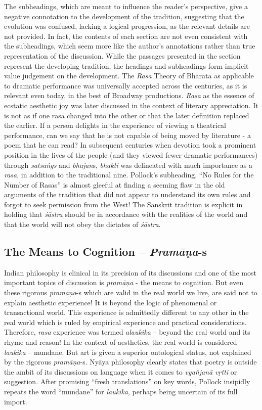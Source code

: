 The subheadings, which are meant to influence the reader’s perspective, give a negative connotation to the development of the tradition, suggesting that the evolution was confused, lacking a logical progression, as the relevant details are not provided. In fact, the contents of each section are not even consistent with the subheadings, which seem more like the author’s annotations rather than true representation of the discussion. While the passages presented in the section represent the developing tradition, the headings and subheadings form implicit value judgement on the development. The \textit{Rasa} Theory of Bharata as applicable to dramatic performance was universally accep\-ted across the centuries, as it is relevant even today, in the best of Broadway productions. \textit{Rasa} as the essence of ecstatic aesthetic joy was later discussed in the context of literary appreciation. It is not as if one rasa changed into the other or that the later definition replaced the earlier. If a person delights in the experience of viewing a theatrical performance, can we say that he is not capable of being moved by literature - a poem that he can read? In subsequent centuries when devotion took a prominent position in the lives of the people (and they viewed fewer dramatic performances) through \textit{satsaṅgs} and \textit{bhajan}s, \textit{bhakti} was delineated with much importance as a \textit{rasa}, in addition to the traditional nine. Pollock’s subheading, “No Rules for the Number of Rasas” is almost gleeful at finding a seeming flaw in the old arguments of the tradition that did not appear to understand its own rules and forgot to seek permission from the West! The Sanskrit tradition is explicit in holding that \textit{śāstra} should be in accordance with the realities of the world and that the world will not obey the dictates of \textit{śāstra}.

\subsection*{The Means to Cognition – \textit{Pramāṇa}-s}

Indian philosophy is clinical in its precision of its discussions and one of the most important topics of discussion is \textit{pramāṇa} - the means to cognition. But even these rigorous \textit{pramāṇa}-s which are valid in the real world we live, are said not to explain aesthetic experience! It is beyond the logic of phenomenal or transactional world. This experience is admittedly different to any other in the real world which is ruled by empirical experience and practical considerations. Therefore, \textit{rasa} experience was termed \textit{alaukika} – beyond the real world and its rhyme and reason! In the context of aesthetics, the real world is considered \textit{laukika} – mundane. But art is given a superior ontological status, not explained by the rigorous \textit{pramāṇa}-s. Nyāya philosophy clearly states that poetry is outside the ambit of its discussions on language when it comes to \textit{vyañjanā vṛtti} or suggestion. After promising “fresh translations” on key words, Pollock insipidly repeats the word “mundane” for \textit{laukika}, perhaps being uncertain of its full import.


